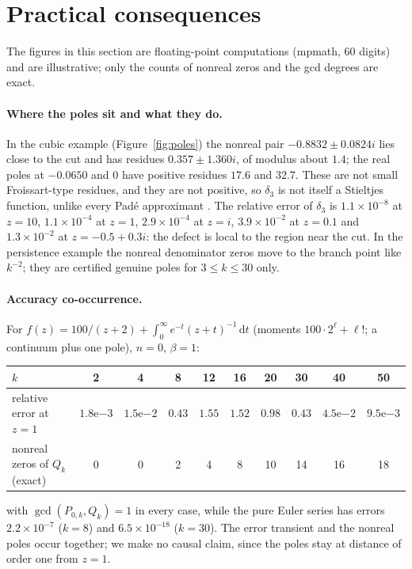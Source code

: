\documentclass[11pt,a4paper]{article}
\theoremstyle{definition}
\theoremstyle{remark}
\newcommand{\dd}{\,\mathrm{d}}
\begin{document}
\section{Practical consequences}\label{sec:practice}

The figures in this section are floating-point computations (mpmath,
60 digits) and are illustrative; only the counts of nonreal zeros and the
gcd degrees are exact.

\paragraph{Where the poles sit and what they do.}
In the cubic example (Figure~\ref{fig:poles}) the nonreal pair
$-0.8832\pm0.0824i$ lies close to the cut and has residues
$0.357\pm1.360i$, of modulus about $1.4$; the real poles at $-0.0650$ and
$0$ have positive residues $17.6$ and $32.7$. These are not small
Froissart-type residues, and they are not positive, so $\delta_3$ is not
itself a Stieltjes function, unlike every Padé approximant
\cite[Ch.~5]{BakerGM1996}. The relative error of $\delta_3$ is
$1.1\times10^{-8}$ at $z=10$, $1.1\times10^{-4}$ at $z=1$,
$2.9\times10^{-4}$ at $z=i$, $3.9\times10^{-2}$ at $z=0.1$ and
$1.3\times10^{-2}$ at $z=-0.5+0.3i$: the defect is local to the region near
the cut. In the persistence example the nonreal denominator zeros move to
the branch point like $k^{-2}$; they are certified genuine poles for
$3\le k\le30$ only.

\paragraph{Accuracy co-occurrence.}
For $f(z)=100/(z+2)+\int_0^\infty e^{-t}(z+t)^{-1}\dd t$ (moments
$100\cdot2^\ell+\ell!$; a continuum plus one pole), $n=0$, $\beta=1$:
\begin{center}
\small
\begin{tabular}{@{}lccccccccc@{}}
\toprule
$k$ & 2 & 4 & 8 & 12 & 16 & 20 & 30 & 40 & 50\\
\midrule
relative error at $z=1$ & $1.8\mathrm{e}{-3}$ & $1.5\mathrm{e}{-2}$ & $0.43$ & $1.55$ & $1.52$ & $0.98$ & $0.43$ & $4.5\mathrm{e}{-2}$ & $9.5\mathrm{e}{-3}$\\
nonreal zeros of $Q_k$ (exact) & 0 & 0 & 2 & 4 & 8 & 10 & 14 & 16 & 18\\
\bottomrule
\end{tabular}
\end{center}
with $\gcd(P_{0,k},Q_k)=1$ in every case, while the pure Euler series has
errors $2.2\times10^{-7}$ ($k=8$) and $6.5\times10^{-18}$ ($k=30$). The
error transient and the nonreal poles occur together; we make no causal
claim, since the poles stay at distance of order one from $z=1$.
\end{document}
